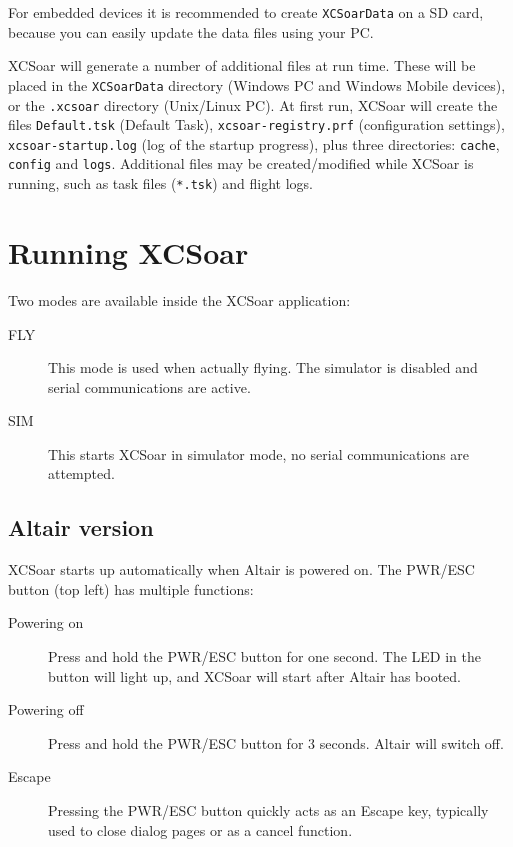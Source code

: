 For embedded devices it is recommended to create \texttt{XCSoarData} on a SD
card, because you can easily update the data files using your PC.


XCSoar will generate a number of additional files at run time.  These
will be placed in the  \texttt{XCSoarData} directory (Windows PC and 
Windows Mobile devices), or the \texttt{.xcsoar} directory (Unix/Linux
PC).  At first run, XCSoar will create the files 
\texttt{Default.tsk} (Default Task),  \texttt{xcsoar-registry.prf} 
(configuration settings), \newline
\texttt{xcsoar-startup.log} (log of the startup progress), 
plus three directories: \texttt{cache},
\texttt{config} and \texttt{logs}.  Additional files may be
created/modified while XCSoar is running, such as task files
(\texttt{*.tsk}) and flight logs.


\section{Running XCSoar}

Two modes are available inside the XCSoar application: 
\begin{description}
\item[FLY] This mode is used when actually flying.  The simulator is 
  disabled and serial communications are active. 
\item[SIM] This starts XCSoar in simulator mode, no serial communications
  are attempted.
\end{description}

\subsection*{Altair version}
XCSoar starts up automatically when Altair is powered on.
The PWR/ESC button (top left) has multiple functions:
\begin{description}
\item[Powering on]  Press and hold the PWR/ESC button for one second.
  The LED in the button will light up, and XCSoar will start after
  Altair has booted.
\item[Powering off]  Press and hold the PWR/ESC button for 3 seconds.
  Altair will switch off.
\item[Escape] Pressing the PWR/ESC button quickly acts as an
Escape key, typically used to close dialog pages or as a cancel function.
\end{description}

